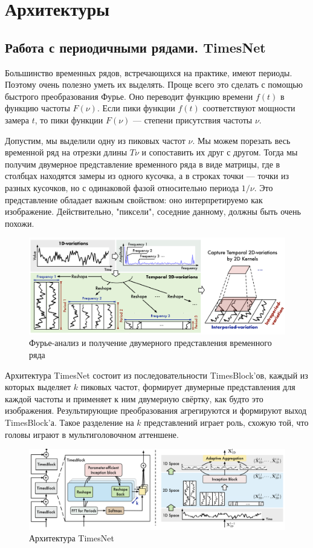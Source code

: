 \documentclass[12pt,fleqn]{article}
\begin{document}
\section{Архитектуры}

\subsection{Работа с периодичными рядами. TimesNet}

Большинство временных рядов, встречающихся на практике, имеют периоды. Поэтому очень полезно уметь их выделять. Проще всего это сделать с помощью быстрого преобразования Фурье. Оно переводит функцию времени $f(t)$ в функцию частоты $F(\nu)$. Если пики функции $f(t)$ соответствуют мощности замера $t$, то пики функции $F(\nu)$ — степени присутствия частоты $\nu$.

Допустим, мы выделили одну из пиковых частот $\nu$. Мы можем порезать весь временной ряд на отрезки длины $T\nu$ и сопоставить их друг с другом. Тогда мы получим двумерное представление временного ряда в виде матрицы, где в столбцах находятся замеры из одного кусочка, а в строках точки — точки из разных кусочков, но с одинаковой фазой относительно периода $1/\nu$. Это представление обладает важным свойством: оно интерпретируемо как изображение. Действительно, "пиксели", соседние данному, должны быть очень похожи.

\begin{figure}[!htb]
    \centering
    \includegraphics[width=0.5\linewidth]{notes.assets/image-20241018014918302.png}
    \caption{Фурье-анализ и получение двумерного представления временного ряда}
    \label{fig:2d-representation}
\end{figure}

Архитектура TimesNet \cite{timesnet} состоит из последовательности TimesBlock'ов, каждый из которых выделяет $k$ пиковых частот, формирует двумерные представления для каждой частоты и применяет к ним двумерную свёртку, как будто это изображения. Результирующие преобразования агрегируются и формируют выход TimesBlock'а. Такое разделение на $k$ представлений играет роль, схожую той, что головы играют в мультиголовочном аттеншене.

\begin{figure}[!htb]
    \centering
    \includegraphics[width=0.5\linewidth]{notes.assets/image-20241018015234974.png}
    \caption{Архитектура TimesNet}
    \label{fig:timesnet}
\end{figure}
\end{document}
